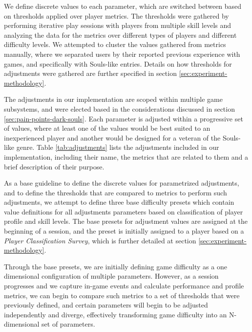 We define discrete values to each parameter, which are switched between based on thresholds applied over player metrics. The thresholds were gathered by performing iterative play sessions with players from multiple skill levels and analyzing the data for the metrics over different types of players and different difficulty levels. We attempted to cluster the values gathered from metrics manually, where we separated users by their reported previous experience with games, and specifically with Souls-like entries. Details on how thresholds for adjustments were gathered are further specified in section \ref{sec:experiment-methodology}.

The adjustments in our implementation are scoped within multiple game subsystems, and were elected based in the considerations discussed in section \ref{sec:pain-points-dark-souls}. Each parameter is adjusted within a progressive set of values, where at least one of the values would be best suited to an inexperienced player and another would be designed for a veteran of the Souls-like genre. Table \ref{tab:adjustments} lists the adjustments included in our implementation, including their name, the metrics that are related to them and a brief description of their purpose.



As a base guideline to define the discrete values for parametrized adjustments, and to define the thresholds that are compared to metrics to perform such adjustments, we attempt to define three base difficulty presets which contain value definitions for all adjustments parameters based on classification of player profile and skill levels. The base presets for adjustment values are assigned at the beginning of a session, and the preset is initially assigned to a player based on a \emph{Player Classification Survey}, which is further detailed at section \ref{sec:experiment-methodology}.

Through the base presets, we are initially defining game difficulty as a one dimensional configuration of multiple parameters. However, as a session progresses and we capture in-game events and calculate performance and profile metrics, we can begin to compare such metrics to a set of thresholds that were previously defined, and certain parameters will begin to be adjusted independently and diverge, effectively transforming game difficulty into an N-dimensional set of parameters.

